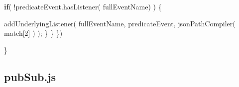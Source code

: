 \documentclass[12pt, ]{article}
\newenvironment{Shaded}{}{}
\newcommand{\KeywordTok}[1]{\textcolor[rgb]{0.00,0.44,0.13}{\textbf{{#1}}}}
\newcommand{\DecValTok}[1]{\textcolor[rgb]{0.25,0.63,0.44}{{#1}}}
\newcommand{\OtherTok}[1]{\textcolor[rgb]{0.00,0.44,0.13}{{#1}}}
\newcommand{\FunctionTok}[1]{\textcolor[rgb]{0.02,0.16,0.49}{{#1}}}
\newcommand{\NormalTok}[1]{{#1}}
\begin{document}
\begin{Shaded}
\begin{Highlighting}[]
         \KeywordTok{if}\NormalTok{( !}\OtherTok{predicateEvent}\NormalTok{.}\FunctionTok{hasListener}\NormalTok{( fullEventName) ) \{  }
                  
            \FunctionTok{addUnderlyingListener}\NormalTok{(}
               \NormalTok{fullEventName,}
               \NormalTok{predicateEvent, }
               \FunctionTok{jsonPathCompiler}\NormalTok{( match[}\DecValTok{2}\NormalTok{] )}
            \NormalTok{);}
         \NormalTok{\}}
      \NormalTok{\}    }
   \NormalTok{\})}

\NormalTok{\}}
\end{Highlighting}
\end{Shaded}

\pagebreak

\subsection{pubSub.js}\label{headerux5fpubSub}

\label{src_pubSub}
\end{document}
